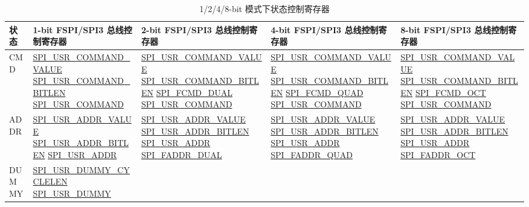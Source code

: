 \documentclass[main\_\_CN.tex]{subfiles}
\begin{document}
\begin{landscape}
\begin{longtable}[c]{ |L{1.3cm}|L{5.2cm}|L{5.2cm}|L{5.2cm}|L{5.2cm}| }
\caption{1/2/4/8-bit 模式下状态控制寄存器}
\\\hline
{}
\textbf{状态} & \textbf{ 1-bit FSPI/SPI3 总线控制寄存器 } & \textbf{ 2-bit FSPI/SPI3 总线控制寄存器} & \textbf{ 4-bit FSPI/SPI3 总线控制寄存器} & \textbf{ 8-bit FSPI/SPI3 总线控制寄存器}\\
     \hline
\endhead
\label{tab:spi-usr1}
CMD  &\hyperref[fielddesc:SPIUSRCOMMANDVALUE]{SPI\_USR\_COMMAND\_VALUE}
      \hyperref[fielddesc:SPIUSRCOMMANDBITLEN]{SPI\_USR\_COMMAND\_BITLEN} \hyperref[fielddesc:SPIUSRCOMMAND]{SPI\_USR\_COMMAND}
     &\hyperref[fielddesc:SPIUSRCOMMANDVALUE]{SPI\_USR\_COMMAND\_VALUE} \hyperref[fielddesc:SPIUSRCOMMANDBITLEN]{SPI\_USR\_COMMAND\_BITLEN} \hyperref[fielddesc:SPIFCMDDUAL]{SPI\_FCMD\_DUAL}     \hyperref[fielddesc:SPIUSRCOMMAND]{SPI\_USR\_COMMAND} & \hyperref[fielddesc:SPIUSRCOMMANDVALUE]{SPI\_USR\_COMMAND\_VALUE}  \hyperref[fielddesc:SPIUSRCOMMANDBITLEN]{SPI\_USR\_COMMAND\_BITLEN}   \hyperref[fielddesc:SPIFCMDQUAD]{SPI\_FCMD\_QUAD}    \hyperref[fielddesc:SPIUSRCOMMAND]{SPI\_USR\_COMMAND} & \hyperref[fielddesc:SPIUSRCOMMANDVALUE]{SPI\_USR\_COMMAND\_VALUE}
        \hyperref[fielddesc:SPIUSRCOMMANDBITLEN]{SPI\_USR\_COMMAND\_BITLEN} \hyperref[fielddesc:SPIFCMDOCT]{SPI\_FCMD\_OCT}     \hyperref[fielddesc:SPIUSRCOMMAND]{SPI\_USR\_COMMAND}\\
     \hline
ADDR &\hyperref[fielddesc:SPIUSRADDRVALUE]{SPI\_USR\_ADDR\_VALUE}
      \hyperref[fielddesc:SPIUSRADDRBITLEN]{SPI\_USR\_ADDR\_BITLEN}    \hyperref[fielddesc:SPIUSRADDR]{SPI\_USR\_ADDR}
     &\hyperref[fielddesc:SPIUSRADDRVALUE]{SPI\_USR\_ADDR\_VALUE}   \hyperref[fielddesc:SPIUSRADDRBITLEN]{SPI\_USR\_ADDR\_BITLEN}    \hyperref[fielddesc:SPIUSRADDR]{SPI\_USR\_ADDR}      \hyperref[fielddesc:SPIFADDRDUAL]{SPI\_FADDR\_DUAL} &
     \hyperref[fielddesc:SPIUSRADDRVALUE]{SPI\_USR\_ADDR\_VALUE}   \hyperref[fielddesc:SPIUSRADDRBITLEN]{SPI\_USR\_ADDR\_BITLEN}    \hyperref[fielddesc:SPIUSRADDR]{SPI\_USR\_ADDR}                \hyperref[fielddesc:SPIFADDRQUAD]{SPI\_FADDR\_QUAD} &  \hyperref[fielddesc:SPIUSRADDRVALUE]{SPI\_USR\_ADDR\_VALUE}
        \hyperref[fielddesc:SPIUSRADDRBITLEN]{SPI\_USR\_ADDR\_BITLEN}    \hyperref[fielddesc:SPIUSRADDR]{SPI\_USR\_ADDR}      \hyperref[fielddesc:SPIFADDROCT]{SPI\_FADDR\_OCT} \\
     \hline
DUMMY&\hyperref[fielddesc:SPIUSRDUMMYCYCLELEN]{SPI\_USR\_DUMMY\_CYCLELEN}
      \hyperref[fielddesc:SPIUSRDUMMY]{SPI\_USR\_DUMMY}

\end{longtable}
\end{landscape}
\end{document}

